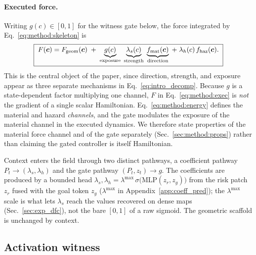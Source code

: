 \paragraph{Executed force.} Writing $g(c)\in[0,1]$ for the witness gate below, the force integrated by Eq.~\eqref{eq:method:skeleton} is
\begin{equation}
\boxed{\;
F(\vec c)
=
F_{\rm geom}(\vec c)
\;+\;
\underbrace{g(c)}_{\text{exposure}}\;
\underbrace{\lambda_s(c)}_{\text{strength}}\;
\underbrace{f_{\rm mat}(\vec c)}_{\text{direction}}
\;+\;
\lambda_h(c)\,f_{\rm haz}(\vec c).
\;}
\label{eq:method:exec}
\end{equation}
This is the central object of the paper, since direction, strength, and exposure appear as three separate mechanisms in Eq.~\eqref{eq:intro_decomp}. Because $g$ is a state-dependent factor multiplying one channel, $F$ in Eq.~\eqref{eq:method:exec} is \emph{not} the gradient of a single scalar Hamiltonian. Eq.~\eqref{eq:method:energy} defines the material and hazard \emph{channels}, and the gate modulates the exposure of the material channel in the executed dynamics. We therefore state properties of the material force channel and of the gate separately (Sec.~\ref{sec:method:props}) rather than claiming the gated controller is itself Hamiltonian.

Context enters the field through two distinct pathways, a coefficient pathway $P_t\!\to\!(\lambda_s,\lambda_h)$ and the gate pathway $(P_t,z_t)\!\to\!g$. The coefficients are produced by a bounded head $\lambda_s,\lambda_h=\lambda^{\max}\,\sigma\!\bigl(\mathrm{MLP}(z_r,z_g)\bigr)$ from the risk patch $z_r$ fused with the goal token $z_g$ ($\lambda^{\max}$ in Appendix~\ref{app:coeff_pred}); the $\lambda^{\max}$ scale is what lets $\lambda_s$ reach the values recovered on dense maps (Sec.~\ref{sec:exp_dfc}), not the bare $[0,1]$ of a raw sigmoid. The geometric scaffold is unchanged by context.

\subsection{Activation witness}
\label{sec:method:witness}

